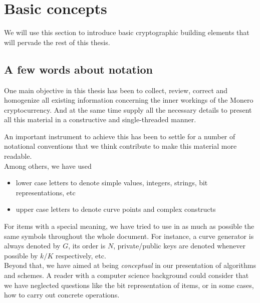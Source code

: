 



\chapter{Basic concepts}
\label{chap:basicConcepts}

We will use this section to introduce basic cryptographic building elements that will pervade the rest of this thesis.


\section{A few words about notation}

One main objective in this thesis has been to collect, review, correct and homogenize all existing information
concerning the inner workings of the Monero cryptocurrency.
And at the same time supply all the necessary details to present all this material in a constructive and single-threaded
manner.

An important instrument to achieve this has been to settle for a number of notational conventions that we think
contribute to make this material more readable.
\\

Among others, we have used
\begin{itemize}
\item lower case letters to denote simple values, integers, strings, bit representations, etc
\item upper case letters to denote curve points and complex constructs
\end{itemize}

For items with a special meaning, we have tried to use in as much as possible the same symbols throughout the
whole document. 
For instance,
a curve generator is always denoted by \(G\), its order is \(N\), private/public keys are denoted whenever possible by \(k/K\) 
respectively, etc.
\\

Beyond that, we have aimed at being {\em conceptual} in our presentation of algorithms and schemes.
A reader with a computer science background could consider that we have neglected
 questions like the bit representation of items, or in some cases, how to carry out concrete operations.

